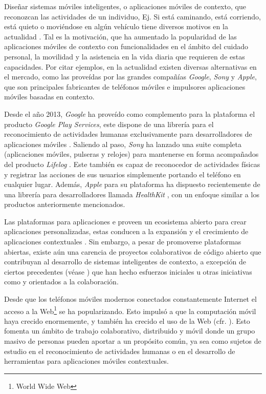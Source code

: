 Diseñar sistemas móviles inteligentes, o aplicaciones móviles de contexto,
que reconozcan las actividades de un individuo, Ej. Si está caminando,
está corriendo, está quieto o moviéndose en algún vehículo tiene diversos
motivos en la actualidad \cite{CampuzanoLopez2015,Google2013l}. Tal
es la motivación, que ha aumentado la popularidad de las aplicaciones
móviles de contexto con funcionalidades en el ámbito del cuidado personal,
la movilidad y la asistencia en la vida diaria que requieren de estas
capacidades. Por citar ejemplos, en la actualidad existen diversas
alternativas en el mercado, como las proveídas por las grandes compañías
\emph{Google}, \emph{Sony} y \emph{Apple}, que son principales fabricantes
de teléfonos móviles e impulsores aplicaciones móviles basadas en
contexto.

Desde el año 2013, \emph{Google} ha proveído como complemento para
la plataforma \emph{ }\cite{Google2005a} el producto
\emph{Google Play Services}, este dispone de una librería para el
reconocimiento de actividades humanas exclusivamente para desarrolladores
de aplicaciones móviles \cite{Google2013l}. Saliendo al paso, \emph{Sony}
ha lanzado una suite completa (aplicaciones móviles, pulseras y relojes)
para mantenerse en forma acompañados del producto \emph{Lifelog} \cite{Sony2016l}.
Este también es capaz de reconocedor de actividades físicas y registrar
las acciones de sus usuarios simplemente portando el teléfono en cualquier
lugar. Además, \emph{Apple} para su plataforma\emph{ }
\cite{Apple2007i} ha dispuesto recientemente de una librería para
desarrolladores llamada \emph{HealthKit} \cite{Apple2016h}, con un
enfoque similar a los productos anteriormente mencionados. 

Las plataformas para aplicaciones \emph{} e \emph{}
proveen un ecosistema abierto para crear aplicaciones personalizadas,
estas conducen a la expansión y el crecimiento de aplicaciones contextuales
\cite{Tanenbaum2010}. Sin embargo, a pesar de promoverse plataformas
abiertas, existe aún una carencia de proyectos colaborativos de código
abierto que contribuyan al desarrollo de sistemas inteligentes de
contexto, a excepción de ciertos precedentes (véase \cite{Kwapisz2011,LaraLabrador2013})
que han hecho esfuerzos iniciales u otras iniciativas como \cite{FUNF2016}
y \cite{SensingKit2016} orientados a la colaboración.

Desde que los teléfonos móviles modernos conectados constantemente
Internet el acceso a la Web\footnote{World Wide Web} se ha popularizando.
Esto impulsó a que la computación móvil haya crecido enormemente,
y también ha crecido el uso de la Web (cfr. \cite{NYTimes2008iph}).
Esto fomenta un ámbito de trabajo colaborativo, distribuido y móvil
donde un grupo masivo de personas pueden aportar a un propósito común,
ya sea como sujetos de estudio en el reconocimiento de actividades
humanas o en el desarrollo de herramientas para aplicaciones móviles
contextuales.

